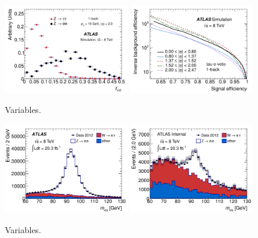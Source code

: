 \begin{figure}[tp]
  \centering
  \includegraphics[width=0.48\textwidth]{figures/PERF-2013-06/fig_08a}
  \includegraphics[width=0.48\textwidth]{figures/PERF-2013-06/fig_09}
  \caption{Variables.}
  \label{fig:taus-electronfakes1}
\end{figure}

\begin{figure}[tp]
  \centering
  \includegraphics[width=0.48\textwidth]{figures/PERF-2013-06/fig_14a}
  \includegraphics[width=0.48\textwidth]{figures/PERF-2013-06/eveto_mvis_mediumID_loosePPOLR_looseeveto}
  \caption{Variables.}
  \label{fig:taus-electronfakes2}
\end{figure}


